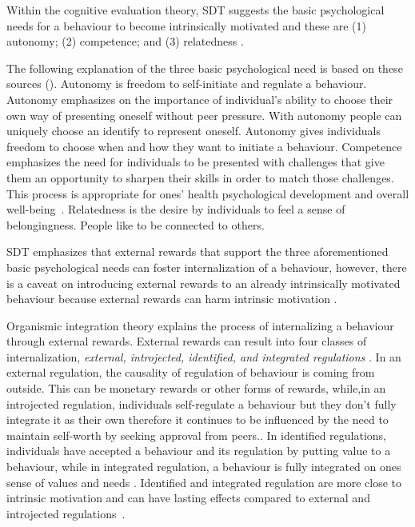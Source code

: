 \documentclass{sig-alternate}
\begin{document}
Within the cognitive evaluation theory, SDT suggests the basic psychological needs for a behaviour to become intrinsically motivated and these are (1) autonomy; (2) competence; and (3) relatedness \cite{deci1985:intrinsic}.

The following explanation of the three basic psychological need is based on these sources (\cite{deci1985:intrinsic,ryan2000:self,lee2015:relating}). Autonomy is freedom to self-initiate and regulate a behaviour. Autonomy emphasizes on the importance of individual's ability to choose their own way of presenting oneself without peer pressure. With autonomy people can uniquely choose an identify to represent oneself. Autonomy gives individuals freedom to choose when and how they want to initiate a behaviour. Competence emphasizes the need for individuals to be presented with challenges that give them an opportunity to sharpen their skills in order to match those challenges. This process is appropriate for ones' health psychological development and  overall well-being~\cite{zhang2008:motivational}. Relatedness is the desire by individuals to feel a sense of belongingness. People like to be connected to others.

SDT emphasizes that external rewards that support the three aforementioned basic psychological needs can foster internalization of a behaviour, however, there is a caveat on introducing external rewards to an already intrinsically motivated behaviour because external rewards can harm intrinsic motivation \cite{ryan2000:self}.

Organismic integration theory explains the process of internalizing a behaviour through external rewards. External rewards can result into four classes of internalization, \emph{external, introjected, identified, and integrated regulations} \cite{ryan2000:self,lee2015:relating}. In an external regulation, the causality of  regulation of behaviour is coming from outside. This can be monetary rewards or other forms of rewards, while,in an introjected regulation, individuals self-regulate a behaviour but they don't fully integrate it as their own therefore it continues to be influenced by the need to maintain self-worth by seeking approval from peers.\cite {lee2015:relating}. In identified  regulations, individuals have accepted a behaviour and its regulation by putting value to a behaviour, while in integrated regulation,  a behaviour is fully integrated on ones sense of values and needs \cite{lee2015:relating}. Identified and integrated regulation are more close to intrinsic motivation and can have lasting effects compared to external and introjected regulations~\cite{ryan2000intrinsic}.
\end{document}
